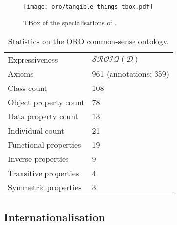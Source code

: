 \begin{figure}
    \centering
    \texttt{[image: oro/tangible\_things\_tbox.pdf]}
    \caption{TBox of the specialisations of .}
    \label{fig|tangible_things_tbox}
\end{figure}


\begin{table}
\begin{center}

\begin{tabular}{ll}
\toprule
Expressiveness & $\mathcal{SROIQ(D)}$ \\
Axioms & 961 (annotations: 359)\\
Class count & 108 \\
Object property count & 78 \\
Data property count & 13 \\
Individual count & 21 \\
Functional properties & 19 \\
Inverse properties & 9 \\
Transitive properties & 4 \\
Symmetric properties & 3 \\
\bottomrule

\end{tabular}
\end{center}

\caption{Statistics on the ORO common-sense ontology.}

\label{table|onto-stats}
\end{table}



\subsection{Internationalisation}
\label{sect|commonsense-i13n}
